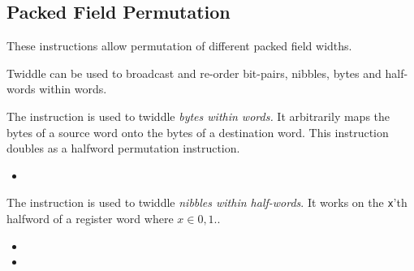 \subsection{Packed Field Permutation}
\label{sec:packed-field-instructions}

These instructions allow permutation of different packed field widths.

Twiddle can be used to broadcast and re-order bit-pairs, nibbles, bytes
and half-words within words.

{\ienctwidb}
{
The  instruction is used to twiddle {\em bytes within words.}
It arbitrarily maps the bytes of a source word onto the bytes of a
destination word.
This instruction doubles as a halfword permutation instruction.
}{
\begin{itemize}
\item {}
\end{itemize}
}{}

{\ienctwidnzero\ienctwidnone}
{
The  instruction is used to twiddle {\em nibbles within 
half-words}.
It works on the {\tt x}'th halfword of a register word where
$x\in{0,1}.$.
}{
\begin{itemize}
\item {}
\item {}
\end{itemize}
}{}


